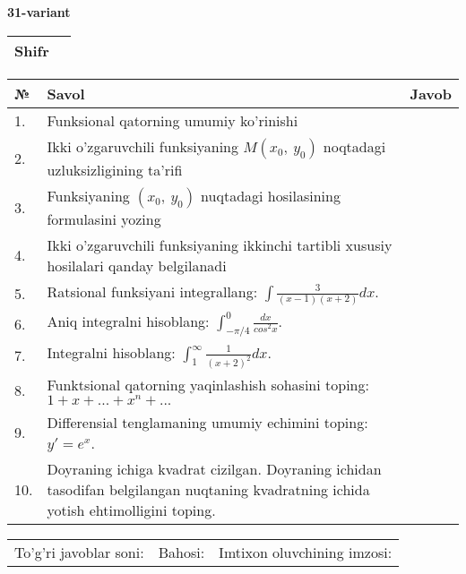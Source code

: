 \documentclass{article}
\begin{document}
  \egroup
  
  \newpage
  
  
  \textbf{31-variant}\\
  
  \bgroup
  \def\arraystretch{1.6} %
  
  \begin{tabular}{|m{5.7cm}|m{9.5cm}|}
  \hline
  Shifr & \\
  \hline
  \end{tabular}
  
  \vspace{1cm}
  
  \begin{tabular}{|m{0.7cm}|m{10cm}|m{4cm}|}
  \hline
  № & Savol & Javob \\
  \hline
  1. & Funksional qatorning umumiy ko'rinishi &  \\
  \hline
  2. & Ikki o'zgaruvchili funksiyaning \(M(x_{0},\ y_{0})\) noqtadagi uzluksizligining ta'rifi &  \\
  \hline
  3. & Funksiyaning \((x_{0},\ y_{0})\) nuqtadagi hosilasining formulasini yozing &  \\
  \hline
  4. & Ikki o'zgaruvchili funksiyaning ikkinchi tartibli xususiy hosilalari qanday belgilanadi &  \\
  \hline
  5. & Ratsional funksiyani integrallang: \(\int {\frac{3}{(x - 1)(x + 2)}dx}\). &  \\
  \hline
  6. & Aniq integralni hisoblang: \(\int_{- \pi/4}^{0}\frac{dx}{cos^{2}x}\). &  \\
  \hline
  7. & Integralni hisoblang: \(\int_{1}^{\infty}{\frac{1}{(x + 2)^{2}}dx}\). &  \\
  \hline
  8. & Funktsional qatorning yaqinlashish sohasini toping:\(1 + x + ... + x^{n} + ...\) &  \\
  \hline
  9. & Differensial tenglamaning umumiy echimini toping: \(y' = e^{x}\). &  \\
  \hline
  10. & Doyraning ichiga kvadrat cizilgan. Doyraning ichidan tasodifan belgilangan nuqtaning kvadratning ichida yotish ehtimolligini toping. &  \\
  \hline
  \end{tabular}
  
  \vspace{1cm}
  
  \begin{tabular}{lll}
  To'g'ri javoblar soni: \underline{\hspace{1.5cm}} & 
  Bahosi: \underline{\hspace{1.5cm}} & 
  Imtixon oluvchining imzosi: \underline{\hspace{2cm}} \\
  \end{tabular}
  
\end{document}
